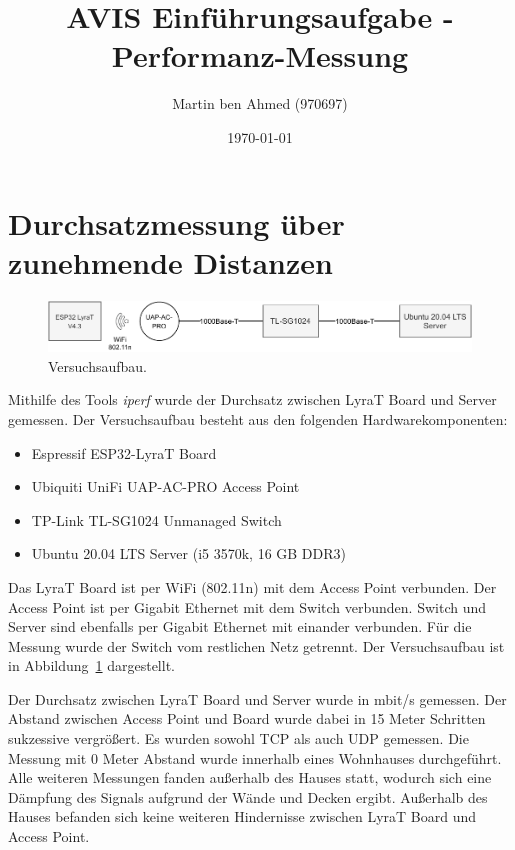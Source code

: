 \documentclass[a4paper]{article}
\title{AVIS Einführungsaufgabe - Performanz-Messung}
\author{
Martin ben Ahmed (970697) \\ 
}
\date{\today}
\begin{document}
\maketitle

\section*{Durchsatzmessung über zunehmende Distanzen}
\noindent
\begin{figure}[ht]
  \centering
  \includegraphics[width=.6\linewidth]{../images/network_architecture.pdf} 
  \caption{Versuchsaufbau.}
  \label{fig:net_arch}
\end{figure}

Mithilfe des Tools \emph{iperf} wurde der Durchsatz zwischen LyraT Board und Server gemessen.
Der Versuchsaufbau besteht aus den folgenden Hardwarekomponenten:
\begin{itemize}
  \item Espressif ESP32-LyraT Board
  \item Ubiquiti UniFi UAP-AC-PRO Access Point 
  \item TP-Link TL-SG1024 Unmanaged Switch
  \item Ubuntu 20.04 LTS Server (i5 3570k, 16 GB DDR3)
\end{itemize}

Das LyraT Board ist per WiFi (802.11n) mit dem Access Point verbunden. 
Der Access Point ist per Gigabit Ethernet mit dem Switch verbunden.
Switch und Server sind ebenfalls per Gigabit Ethernet mit einander verbunden.
Für die Messung wurde der Switch vom restlichen Netz getrennt.
Der Versuchsaufbau ist in Abbildung~\ref{fig:net_arch} dargestellt.

Der Durchsatz zwischen LyraT Board und Server wurde in mbit/s gemessen. 
Der Abstand zwischen Access Point und Board wurde dabei in 15 Meter Schritten sukzessive vergrößert.
Es wurden sowohl TCP als auch UDP gemessen. 
Die Messung mit 0 Meter Abstand wurde innerhalb eines Wohnhauses durchgeführt.
Alle weiteren Messungen fanden außerhalb des Hauses statt, wodurch sich eine Dämpfung des Signals aufgrund der Wände und Decken ergibt.
Außerhalb des Hauses befanden sich keine weiteren Hindernisse zwischen LyraT Board und Access Point.
\end{document}
